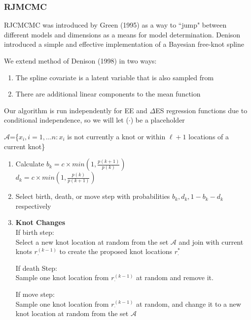 \documentclass[handout]{beamer}\usepackage[]{graphicx}\usepackage[]{color}
\begin{document}
\begin{frame}
\frametitle{RJMCMC}
RJCMCMC was introduced by Green (1995) as a way to ``jump" between different models and dimensions as a means for model determination. Denison introduced a simple and effective implementation of a Bayesian free-knot spline

\vspace{0.3cm}

We extend method of Denison (1998) in two ways:
\begin{enumerate}
\item
The spline covariate is a latent variable that is also sampled from
\item
There are additional linear components to the mean function
\end{enumerate}

\vspace{0.3cm}
Our algorithm is run independently for EE and $\Delta$ES regression functions due to conditional independence, so we will let ($\cdot$) be a placeholder

\end{frame}

\begin{frame}
$\mathcal{A}$=\{$x_i,i=1,...n:x_i$ is not currently a knot or within $\ell+1$ locations of a current knot\}


\begin{enumerate}
\item
Calculate $b_k = c \times min\left(1, \frac{p(k+1)}{p(k)} \right)$ \\
$d_k = c \times min\left(1, \frac{p(k)}{p(k+1)} \right)$ 

\item
Select birth, death, or move step with probabilities $b_k,d_k,1-b_k-d_k$ respectively \\

\item
{\bf Knot Changes} \\
If birth step:\\
Select a new knot location at random from the set $\mathcal{A}$ and join with current knots $r_{\cdot}^{(k-1)}$ to create the proposed knot locations $r_{\cdot}^{*}$

If death Step:\\
Sample one knot location from $r_{\cdot}^{(k-1)}$ at random and remove it. 

If move step:\\
Sample one knot location from $r_{\cdot}^{(k-1)}$ at random, and change it to a new knot location at random from the set $\mathcal{A}$

\end{enumerate}
\end{frame}
\end{document}
